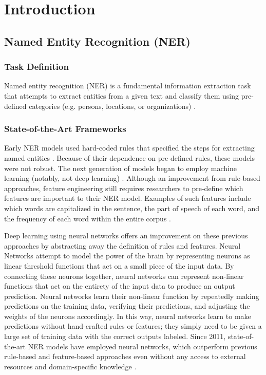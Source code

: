\addchapheadtotoc
\chapter{Introduction}
\section{Named Entity Recognition (NER)}
\subsection{Task Definition}
Named entity recognition (NER) is a fundamental information extraction task that attempts to extract entities from a given text and classify them using pre-defined categories (e.g. persons, locations, or organizations) \cite{2007Survey}.

\subsection{State-of-the-Art Frameworks}
Early NER models used hard-coded rules that specified the steps for extracting named entities \cite{NeuralNERSurvey}. Because of their dependence on pre-defined rules, these models were not robust. The next generation of models began to employ machine learning (notably, not deep learning) \cite{NeuralNERSurvey}. Although an improvement from rule-based approaches, feature engineering still requires researchers to pre-define which features are important to their NER model. Examples of such features include which words are capitalized in the sentence, the part of speech of each word, and the frequency of each word within the entire corpus \cite{2007Survey}.

Deep learning using neural networks offers an improvement on these previous approaches by abstracting away the definition of rules and features. Neural Networks attempt to model the power of the brain by representing neurons as linear threshold functions that act on a small piece of the input data. By connecting these neurons together, neural networks can represent non-linear functions that act on the entirety of the input data to produce an output prediction. Neural networks learn their non-linear function by repeatedly making predictions on the training data, verifying their predictions, and adjusting the weights of the neurons accordingly. In this way, neural networks learn to make predictions without hand-crafted rules or features; they simply need to be given a large set of training data with the correct outputs labeled. Since 2011, state-of-the-art NER models have employed neural networks, which outperform previous rule-based and feature-based approaches even without any access to external resources and domain-specific knowledge \cite{NeuralNERSurvey}.

